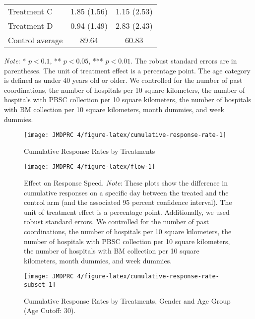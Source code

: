 \documentclass[12pt, a4paper]{article}
\begin{document}
\begin{table}[H]
\begin{threeparttable}
\begin{tabular}[t]{lcc}
\hspace{1em}Treatment C & 1.85 (1.56) & 1.15 (2.53)\\
\hspace{1em}Treatment D & 0.94 (1.49) & 2.83 (2.43)\\
\hspace{1em}Control average & 89.64 & 60.83\\
\bottomrule
\end{tabular}
\begin{tablenotes}
\item \emph{Note}: * $p < 0.1$, ** $p < 0.05$, *** $p < 0.01$. The robust standard errors are in parentheses. The unit of treatment effect is a percentage point. The age category is defined as under 40 years old or older. We controlled for the number of past coordinations, the number of hospitals per 10 square kilometers, the number of hospitals with PBSC collection per 10 square kilometers, the number of hospitals with BM collection per 10 square kilometers, month dummies, and week dummies.
\end{tablenotes}
\end{threeparttable}
\end{table}

\begin{figure}[H]
\texttt{[image: JMDPRC~4/figure-latex/cumulative-response-rate-1]} \caption{Cumulative Response Rates by Treatments}\label{fig:cumulative-response-rate}
\end{figure}

\begin{figure}[H]
\texttt{[image: JMDPRC~4/figure-latex/flow-1]} \caption{Effect on Response Speed. \newline \emph{Note}: These plots show the difference in cumulative responses on a specific day between the treated and the control arm (and the associated 95 percent confidence interval). The unit of treatment effect is a percentage point. Additionally, we used robust standard errors. We controlled for the number of past coordinations, the number of hospitals per 10 square kilometers, the number of hospitals with PBSC collection per 10 square kilometers, the number of hospitals with BM collection per 10 square kilometers, month dummies, and week dummies.}\label{fig:flow}
\end{figure}

\begin{figure}[H]
\texttt{[image: JMDPRC~4/figure-latex/cumulative-response-rate-subset-1]} \caption{Cumulative Response Rates by Treatments, Gender and Age Group (Age Cutoff: 30).}\label{fig:cumulative-response-rate-subset}
\end{figure}
\end{document}

